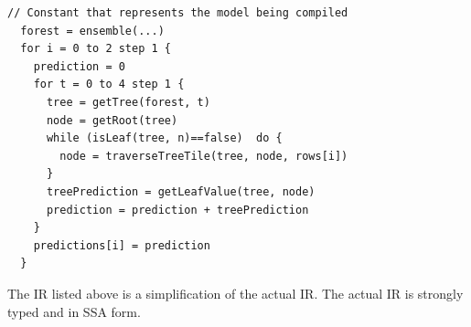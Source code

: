\begin{lstlisting}[style=c++]
  // Constant that represents the model being compiled
  forest = ensemble(...)
  for i = 0 to 2 step 1 {
    prediction = 0
    for t = 0 to 4 step 1 {
      tree = getTree(forest, t) 
      node = getRoot(tree)
      while (isLeaf(tree, n)==false)  do {
        node = traverseTreeTile(tree, node, rows[i])
      }
      treePrediction = getLeafValue(tree, node)
      prediction = prediction + treePrediction
    }
    predictions[i] = prediction
  }
\end{lstlisting}

The IR listed above is a simplification of the actual IR. The actual IR is strongly typed and in SSA form.


